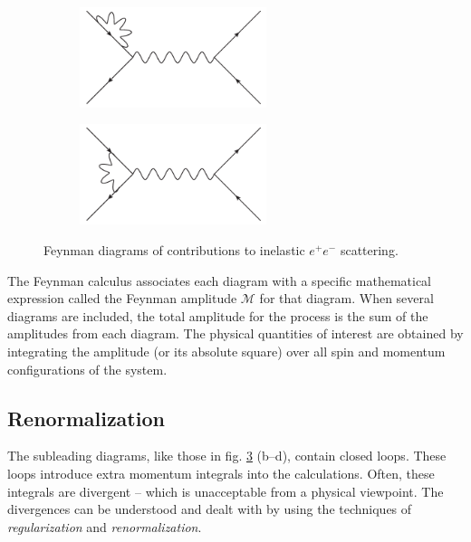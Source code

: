 \documentclass[twoside,english]{uiofysmaster}
\begin{document}
\begin{figure}[htbp]
	\begin{subfigure}[b]{0.45\textwidth}
		\centering
		\includegraphics[width=0.6\textwidth]{figures/susyintro/epscattering_fermioncorr.pdf}
		\caption{ }
		\label{fig:feynmandiagram_c}
	\end{subfigure}
	\begin{subfigure}[b]{0.45\textwidth}
		\centering
		\includegraphics[width=0.6\textwidth]{figures/susyintro/epscattering_vertexcorr.pdf}
		\caption{ }
		\label{fig:feynmandiagram_d}
	\end{subfigure}
	\caption{Feynman diagrams of contributions to inelastic $e^+ e^-$ scattering.}
	\label{fig:feynmandiagram}
\end{figure}
The Feynman calculus associates each diagram with a specific mathematical expression called the Feynman amplitude $\mathcal{M}$ for that diagram. When several diagrams are included, the total amplitude for the process is the sum of the amplitudes from each diagram. The physical quantities of interest are obtained by integrating the amplitude (or its absolute square) over all spin and momentum configurations of the system.

\subsection{Renormalization}
The subleading diagrams, like those in fig.  \ref{fig:feynmandiagram} (b--d), contain closed loops. These loops introduce extra momentum integrals into the calculations. Often, these integrals are divergent -- which is unacceptable from a physical viewpoint. The divergences can be understood and dealt with by using the techniques of {\it regularization} and {\it renormalization}. 
\end{document}
